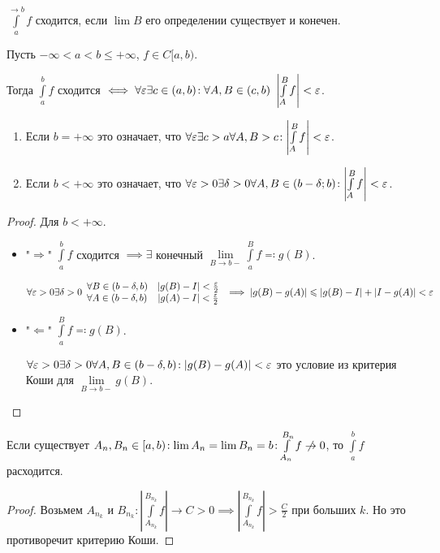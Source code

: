\begin{definition}
    $\int\limits_a^{\to b} f$ сходится, если  $\lim B$ его определении существует и конечен.
\end{definition}

\begin{theorem}
    Пусть $-\infty < a < b \le +\infty$, $f \in C[a, b)$.

    Тогда $\int\limits_a^b f$ сходится  $\iff \forall \varepsilon \exists c \in (a, b)\!: \forall A, B \in (c, b)\ \left|\int\limits_A^B f\right| < \varepsilon$. 
\end{theorem}
\begin{remark}
    \begin{enumerate}
        \item Если $b = +\infty$ это означает, что  $\forall \varepsilon \exists c > a \forall A, B > c\!: \left| \int\limits_A^B f \right|  < \varepsilon$.
        \item  Если $b < +\infty$ это означает, что  $\forall \varepsilon > 0 \exists \delta > 0 \forall A, B \in (b-\delta; b)\!: \left|\int\limits_A^B f \right| < \varepsilon$.
    \end{enumerate}
\end{remark}
\begin{proof}
    Для $b < +\infty$. 
      \begin{itemize}
          \item "$\Rightarrow$" $\int\limits_a^b f$ сходится  $\implies \exists$ конечный  $\lim\limits_{B \to b-} \int\limits_a^B f \eqqcolon g(B)$.

              $\forall \varepsilon > 0 \exists \delta > 0 \begin{array}{lc} 
              \forall B \in (b - \delta, b) & |g(B) - I| < \frac{\varepsilon}{2}\\ 
          \forall A \in(b - \delta, b) & |g(A) - I| < \frac{\varepsilon}{2}\end{array} \implies |g(B) - g(A)| \leqslant |g(B) - I| + |I - g(A)| < \varepsilon$
      \item "$\Leftarrow$" $\int\limits_a^B f \eqqcolon g(B)$.

          $\forall \varepsilon > 0 \exists \delta > 0 \forall A, B \in (b-\delta, b)\!: |g(B)- g(A)| < \varepsilon$ это условие из критерия Коши для $\lim\limits_{B \to b-} g(B)$.
  \end{itemize}
\end{proof}
\begin{remark}
    Если существует $A_n, B_n \in [a, b)\!: \lim A_n = \lim B_n = b\!: \int\limits_{A_n}^{B_n} f \centernot\to 0$, то  $\int\limits_a^b f$ расходится.
\end{remark}
\begin{proof}
    Возьмем $A_{n_k}$ и  $B_{n_k}\!: |\int\limits_{A_{n_k}}^{B_{n_k}} f| \to C > 0 \implies |\int\limits_{A_{n_k}}^{B_{n_k}} f| > \frac{C}{2}$ при больших $k$. Но это противоречит критерию Коши.
\end{proof}

